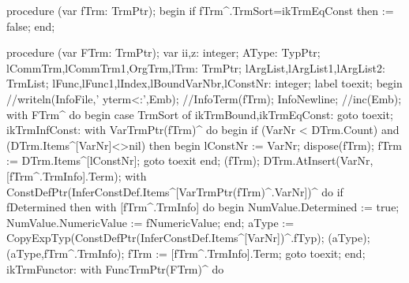 procedure (var fTrm: TrmPtr);
begin
   if fTrm^.TrmSort=ikTrmEqConst then  := false;
end;

\eatline
{}\nwendcode{}\nwdocspar
\nwenddocs{}\endmoddef\nwstartdeflinemarkup{}\nwenddeflinemarkup
procedure (var FTrm: TrmPtr);
var
   ii,z: integer;
   AType: TypPtr;
   lCommTrm,lCommTrm1,OrgTrm,lTrm: TrmPtr;
   lArgList,lArgList1,lArgList2: TrmList;
   lFunc,lFunc1,lIndex,lBoundVarNbr,lConstNr: integer;
label toexit;
begin
   //writeln(InfoFile,'  yterm<:',Emb);
   //InfoTerm(fTrm); InfoNewline;
   //inc(Emb);
   with FTrm^ do
   begin
      case TrmSort of
         ikTrmBound,ikTrmEqConst: goto toexit;
         ikTrmInfConst:
            with VarTrmPtr(fTrm)^ do
         begin
            if (VarNr < DTrm.Count) and (DTrm.Items^[VarNr]<>nil) then
            begin
               lConstNr := VarNr;
               dispose(fTrm);
               fTrm := DTrm.Items^[lConstNr];
               goto toexit
            end;
            (fTrm);
            DTrm.AtInsert(VarNr,[fTrm^.TrmInfo].Term);
            with ConstDefPtr(InferConstDef.Items^[VarTrmPtr(fTrm)^.VarNr])^ do
               if fDetermined then
                  with [fTrm^.TrmInfo] do
               begin
                  NumValue.Determined := true;
                  NumValue.NumericValue := fNumericValue;
               end;
            aType := CopyExpTyp(ConstDefPtr(InferConstDef.Items^[VarNr])^.fTyp);
            (aType);
            (aType,fTrm^.TrmInfo);
            fTrm := [fTrm^.TrmInfo].Term;
            goto toexit;
         end;
         ikTrmFunctor:
            with FuncTrmPtr(FTrm)^ do

